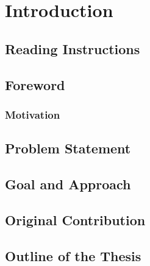 \chapter{Introduction}
\label{ChapterOne}
\section{Reading Instructions}
\label{sec:Reading Instructions}
%
\section{Foreword}
\label{sec:Foreword}


\subsection{Motivation}          
\label{subsec:Motivation}

\section{Problem Statement}
\label{sec:Problem Statement}

\section{Goal and Approach}
\label{sec:GoalAndApproach}

\section{Original Contribution}
\label{sec:OriginalContribution}


\section{Outline of the Thesis}
\label{sec:OutlineOfTheThesis}